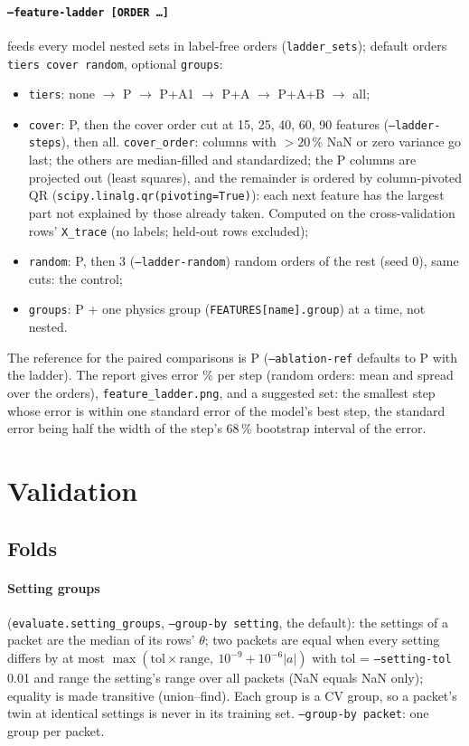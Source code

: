 \documentclass[10pt]{article}
\newcommand{\code}[1]{\texttt{#1}}
\begin{document}
\paragraph{\code{--feature-ladder [ORDER \dots]}} feeds every model nested sets in label-free orders
(\code{ladder\_sets}); default orders \code{tiers cover random}, optional \code{groups}:
\begin{itemize}
  \item \code{tiers}: none $\to$ P $\to$ P+A1 $\to$ P+A $\to$ P+A+B $\to$ all;
  \item \code{cover}: P, then the cover order cut at 15, 25, 40, 60, 90 features (\code{--ladder-steps}), then all.
        \code{cover\_order}: columns with $> 20$\,\% NaN or zero variance go last; the others are median-filled and
        standardized; the P columns are projected out (least squares), and the remainder is ordered by column-pivoted
        QR (\code{scipy.linalg.qr(pivoting=True)}): each next feature has the largest part not explained by those already
        taken. Computed on the cross-validation rows' \code{X\_trace} (no labels; held-out rows excluded);
  \item \code{random}: P, then 3 (\code{--ladder-random}) random orders of the rest (seed 0), same cuts: the control;
  \item \code{groups}: P + one physics group (\code{FEATURES[name].group}) at a time, not nested.
\end{itemize}
The reference for the paired comparisons is P (\code{--ablation-ref} defaults to P with the ladder). The report gives
error \% per step (random orders: mean and spread over the orders), \code{feature\_ladder.png}, and a suggested set: the
smallest step whose error is within one standard error of the model's best step, the standard error being half the
width of the step's 68\,\% bootstrap interval of the error.

\section{Validation}
\label{sec:val}

\subsection{Folds}

\paragraph{Setting groups} (\code{evaluate.setting\_groups}, \code{--group-by setting}, the default): the settings of a
packet are the median of its rows' $\theta$; two packets are equal when every setting differs by at most
$\max(\mathrm{tol}\times\mathrm{range},\ 10^{-9} + 10^{-6}|a|)$ with tol = \code{--setting-tol} 0.01 and range the
setting's range over all packets (NaN equals NaN only); equality is made transitive (union--find). Each group is a CV
group, so a packet's twin at identical settings is never in its training set. \code{--group-by packet}: one group per
packet.
\end{document}
